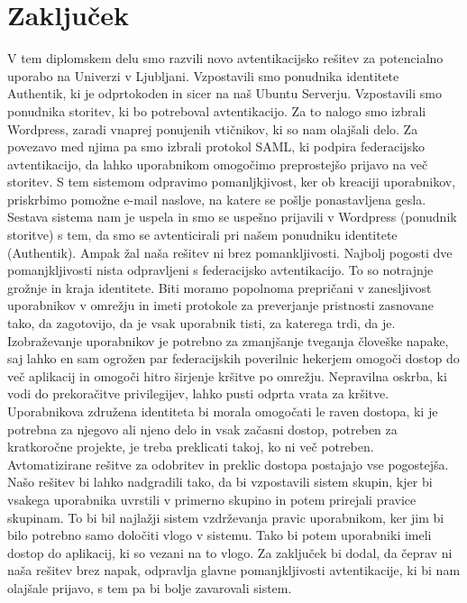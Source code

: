 \documentclass[a4paper,12pt,openright]{book}
\begin{document}
{\chapter{Zaključek}

V tem diplomskem delu smo razvili novo avtentikacijsko rešitev za potencialno uporabo na Univerzi v Ljubljani. Vzpostavili smo ponudnika identitete Authentik, ki je odprtokoden in sicer na naš Ubuntu Serverju. Vzpostavili smo ponudnika storitev, ki bo potreboval avtentikacijo. Za to nalogo smo izbrali Wordpress, zaradi vnaprej ponujenih vtičnikov, ki so nam olajšali delo. Za povezavo med njima pa smo izbrali protokol SAML, ki podpira federacijsko avtentikacijo, da lahko uporabnikom omogočimo preprostejšo prijavo na več storitev. 
\newline
S tem sistemom odpravimo pomanljkjivost, ker ob kreaciji uporabnikov, priskrbimo pomožne e-mail naslove, na katere se pošlje ponastavljena gesla. 
\newline
Sestava sistema nam je uspela in smo se uspešno prijavili v Wordpress (ponudnik storitve) s tem, da smo se avtenticirali pri našem ponudniku identitete (Authentik). 
\newline
Ampak žal naša rešitev ni brez pomankljivosti. Najbolj pogosti dve pomanjkljivosti nista odpravljeni s federacijsko avtentikacijo. To so notrajnje grožnje in kraja identitete. Biti moramo popolnoma prepričani v zanesljivost uporabnikov v omrežju in imeti protokole za preverjanje pristnosti zasnovane tako, da zagotovijo, da je vsak uporabnik tisti, za katerega trdi, da je. Izobraževanje uporabnikov je potrebno za zmanjšanje tveganja človeške napake, saj lahko en sam ogrožen par federacijskih poverilnic hekerjem omogoči dostop do več aplikacij in omogoči hitro širjenje kršitve po omrežju.
Nepravilna oskrba, ki vodi do prekoračitve privilegijev, lahko pusti odprta vrata za kršitve. Uporabnikova združena identiteta bi morala omogočati le raven dostopa, ki je potrebna za njegovo ali njeno delo in vsak začasni dostop, potreben za kratkoročne projekte, je treba preklicati takoj, ko ni več potreben. Avtomatizirane rešitve za odobritev in preklic dostopa postajajo vse pogostejša.
\newline
Našo rešitev bi lahko nadgradili tako, da bi vzpostavili sistem skupin, kjer bi vsakega uporabnika uvrstili v primerno skupino in potem prirejali pravice skupinam. To bi bil najlažji sistem vzdrževanja pravic uporabnikom, ker jim bi bilo potrebno samo določiti vlogo v sistemu. Tako bi potem uporabniki imeli dostop do aplikacij, ki so vezani na to vlogo. 
\newline
Za zaključek bi dodal, da čeprav ni naša rešitev brez napak, odpravlja glavne pomanjkljivosti avtentikacije, ki bi nam olajšale prijavo, s tem pa bi bolje zavarovali sistem. 


}
\end{document}
